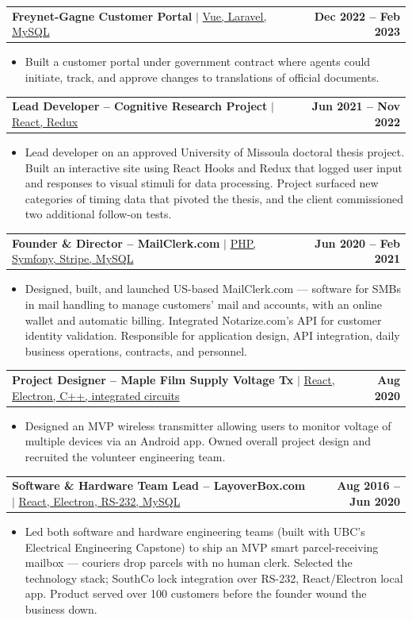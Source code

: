 \documentclass[letterpaper,11pt]{article}
\makeatletter
\newcommand{\resumeItemNoBullet}[1]{
  \item[] \small{
    {#1 \vspace{-2pt}}
  }
}
\newcommand{\resumeProjectHeading}[2]{
    \item
    \begin{tabular*}{1.001\textwidth}{l@{\extracolsep{\fill}}r}
      \small#1 & \textbf{\small #2}\\
    \end{tabular*}\vspace{-7pt}
}
\newcommand{\resumeItemListStart}{\begin{itemize}}
\newcommand{\resumeItemListEnd}{\end{itemize}\vspace{-5pt}}
\makeatother
\begin{document}
  \resumeProjectHeading
    {\textbf{\large{Freynet-Gagne Customer Portal}} $|$ \underline{Vue, Laravel, MySQL}}{Dec 2022 -- Feb 2023}
  \resumeItemListStart
    \resumeItemNoBullet{\normalsize{Built a customer portal under government contract where agents could initiate, track, and approve changes to translations of official documents.}}
  \resumeItemListEnd

  \resumeProjectHeading
    {\textbf{\large{Lead Developer -- Cognitive Research Project}} $|$ \underline{React, Redux}}{Jun 2021 -- Nov 2022}
  \resumeItemListStart
    \resumeItemNoBullet{\normalsize{Lead developer on an approved University of Missoula doctoral thesis project. Built an interactive site using React Hooks and Redux that logged user input and responses to visual stimuli for data processing. Project surfaced new categories of timing data that pivoted the thesis, and the client commissioned two additional follow-on tests.}}
  \resumeItemListEnd

  \resumeProjectHeading
    {\textbf{\large{Founder \& Director -- MailClerk.com}} $|$ \underline{PHP, Symfony, Stripe, MySQL}}{Jun 2020 -- Feb 2021}
  \resumeItemListStart
    \resumeItemNoBullet{\normalsize{Designed, built, and launched US-based MailClerk.com — software for SMBs in mail handling to manage customers' mail and accounts, with an online wallet and automatic billing. Integrated Notarize.com's API for customer identity validation. Responsible for application design, API integration, daily business operations, contracts, and personnel.}}
  \resumeItemListEnd

  \resumeProjectHeading
    {\textbf{\large{Project Designer -- Maple Film Supply Voltage Tx}} $|$ \underline{React, Electron, C++, integrated circuits}}{Aug 2020}
  \resumeItemListStart
    \resumeItemNoBullet{\normalsize{Designed an MVP wireless transmitter allowing users to monitor voltage of multiple devices via an Android app. Owned overall project design and recruited the volunteer engineering team.}}
  \resumeItemListEnd

  \resumeProjectHeading
    {\textbf{\large{Software \& Hardware Team Lead -- LayoverBox.com}} $|$ \underline{React, Electron, RS-232, MySQL}}{Aug 2016 -- Jun 2020}
  \resumeItemListStart
    \resumeItemNoBullet{\normalsize{Led both software and hardware engineering teams (built with UBC's Electrical Engineering Capstone) to ship an MVP smart parcel-receiving mailbox — couriers drop parcels with no human clerk. Selected the technology stack; SouthCo lock integration over RS-232, React/Electron local app. Product served over 100 customers before the founder wound the business down.}}
  \resumeItemListEnd
\end{document}

